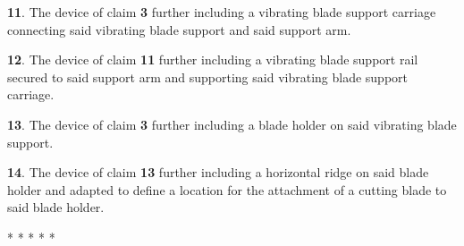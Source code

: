 \documentclass{article}
\begin{document}
\begin{hangpars}
\textbf{11}. The device of claim \textbf{3} further including a vibrating blade support carriage connecting said vibrating blade support and said support arm.

\textbf{12}. The device of claim \textbf{11} further including a vibrating blade support rail secured to said support arm and supporting said vibrating blade support carriage.

\textbf{13}. The device of claim \textbf{3} further including a blade holder on said vibrating blade support.

\textbf{14}. The device of claim \textbf{13} further including a horizontal ridge on said blade holder and adapted to define a location for the attachment of a cutting blade to said blade holder.

\end{hangpars}

\begin{center}
* * * * *
\end{center}
\end{document}
